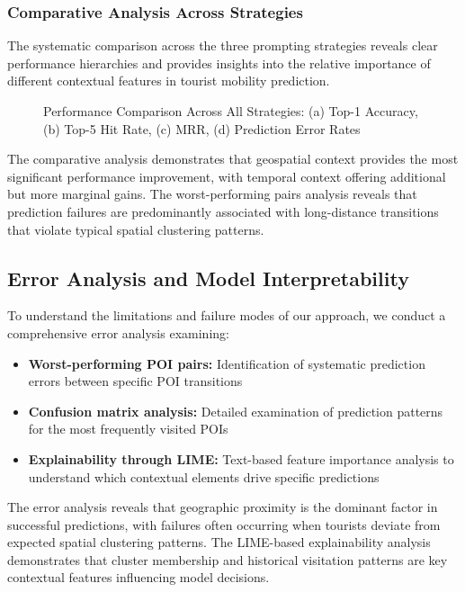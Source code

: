 \documentclass[12pt,a4paper]{article}
\begin{document}
\subsubsection{Comparative Analysis Across Strategies}

The systematic comparison across the three prompting strategies reveals clear performance hierarchies and provides insights into the relative importance of different contextual features in tourist mobility prediction.

\begin{figure}[h]
\centering
\caption{Performance Comparison Across All Strategies: (a) Top-1 Accuracy, (b) Top-5 Hit Rate, (c) MRR, (d) Prediction Error Rates}
\label{fig:strategy_comparison_detailed}
\end{figure}

The comparative analysis demonstrates that geospatial context provides the most significant performance improvement, with temporal context offering additional but more marginal gains. The worst-performing pairs analysis reveals that prediction failures are predominantly associated with long-distance transitions that violate typical spatial clustering patterns.

\subsection{Error Analysis and Model Interpretability}

To understand the limitations and failure modes of our approach, we conduct a comprehensive error analysis examining:

\begin{itemize}
\item \textbf{Worst-performing POI pairs:} Identification of systematic prediction errors between specific POI transitions
\item \textbf{Confusion matrix analysis:} Detailed examination of prediction patterns for the most frequently visited POIs
\item \textbf{Explainability through LIME:} Text-based feature importance analysis to understand which contextual elements drive specific predictions
\end{itemize}

The error analysis reveals that geographic proximity is the dominant factor in successful predictions, with failures often occurring when tourists deviate from expected spatial clustering patterns. The LIME-based explainability analysis demonstrates that cluster membership and historical visitation patterns are key contextual features influencing model decisions.
\end{document}
